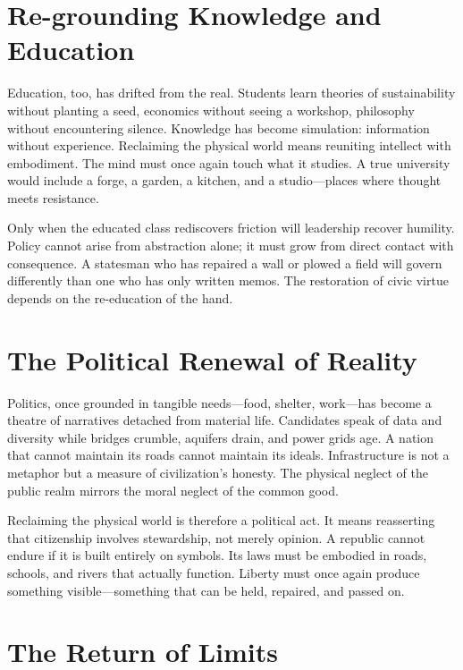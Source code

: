 \documentclass[11pt,twoside]{book}
\begin{document}
\section*{Re-grounding Knowledge and Education}

Education, too, has drifted from the real.  
Students learn theories of sustainability without planting a seed, economics without seeing a workshop, philosophy without encountering silence.  
Knowledge has become simulation: information without experience.  
Reclaiming the physical world means reuniting intellect with embodiment.  
The mind must once again touch what it studies.  
A true university would include a forge, a garden, a kitchen, and a studio—places where thought meets resistance.

Only when the educated class rediscovers friction will leadership recover humility.  
Policy cannot arise from abstraction alone; it must grow from direct contact with consequence.  
A statesman who has repaired a wall or plowed a field will govern differently than one who has only written memos.  
The restoration of civic virtue depends on the re-education of the hand.

\section*{The Political Renewal of Reality}

Politics, once grounded in tangible needs—food, shelter, work—has become a theatre of narratives detached from material life.  
Candidates speak of data and diversity while bridges crumble, aquifers drain, and power grids age.  
A nation that cannot maintain its roads cannot maintain its ideals.  
Infrastructure is not a metaphor but a measure of civilization’s honesty.  
The physical neglect of the public realm mirrors the moral neglect of the common good.

Reclaiming the physical world is therefore a political act.  
It means reasserting that citizenship involves stewardship, not merely opinion.  
A republic cannot endure if it is built entirely on symbols.  
Its laws must be embodied in roads, schools, and rivers that actually function.  
Liberty must once again produce something visible—something that can be held, repaired, and passed on.

\section*{The Return of Limits}
\end{document}
